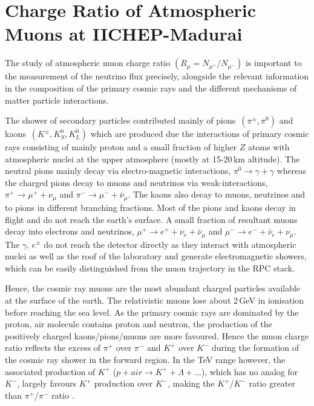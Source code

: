 
\chapter{Charge Ratio of Atmospheric Muons at IICHEP-Madurai}


The study of atmospheric muon charge ratio
$\left(R_{\mu}=N_{\mu^{+}}/N_{\mu^{-}}\right)$
is important to the measurement of the neutrino flux precisely,
alongside the relevant information in the composition of the primary
cosmic rays and the different mechanisms of matter particle interactions.

The shower of secondary particles contributed mainly of
\mbox{pions $\left(\pi^{\pm}, \pi^0\right)$} and
\mbox{kaons $\left(K^{\pm}, K^0_S, K^0_L\right)$} which are produced due the
interactions of primary cosmic rays consisting of mainly proton
and a small fraction of higher $Z$ atoms \cite{cosmic1,pdgspectra1}
with atmospheric nuclei at the upper atmosphere (mostly at 15-20\,km
altitude).
The neutral pions mainly decay via electro-magnetic interactions,
$\pi^0 \rightarrow \gamma+\gamma$ whereas the charged pions decay to
muons and neutrinos via weak-interactions,
$\pi^+ \rightarrow \mu^+ + \nu_{\mu}$ and
$\pi^- \rightarrow \mu^- + \bar{\nu}_{\mu}$. The kaons also decay to
muons, neutrinos and to pions in different branching fractions.
Most of the pions and kaons decay in flight and do not reach the
earth's surface.
A small fraction of resultant muons decay into electrons and neutrinos,
$\mu^+ \rightarrow e^+ + \nu_{e} + \bar{\nu}_{\mu}$ and
$\mu^- \rightarrow e^- + \bar{\nu}_{e} + \nu_{\mu}$.
The $\gamma$, $e^{\pm}$ do not reach the detector directly as they
interact with atmospheric nuclei as well as the roof of the laboratory
and generate electromagnetic showers, which can be easily distinguished
from the muon trajectory in the RPC stack.

Hence, the cosmic ray muons are the most abundant charged particles
available at the surface of the earth. The relativistic muons lose
about 2\,GeV in ionisation before reaching the sea level.
As the primary cosmic rays are dominated by the proton, air molecule
  contains proton and neutron, the production of the positively
  charged kaons/pions/muons are more favoured.
Hence the muon charge ratio reflects the excess of $\pi^{+}$ over
$\pi^{-}$ and $K^{+}$ over $K^{-}$ during the formation of the
cosmic ray shower in the forward region. In the TeV range however,
the associated production of $K^{+}$
($p+air \rightarrow K^{+} + \Lambda + ...$), which has no analog for $K^{-}$,
largely favours $K^{+}$ production over $K^{-}$, making the
$K^{+}$/$K^{-}$ ratio greater than $\pi^{+}$/$\pi^{-}$ ratio
\cite{adamson2007}.

